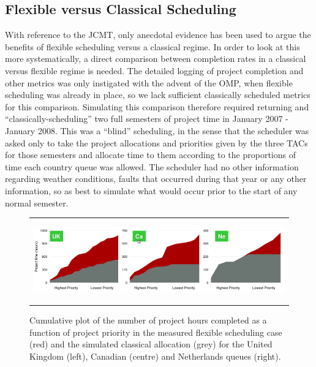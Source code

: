 \documentclass[]{spie}  %
\begin{document}
\subsection{Flexible versus Classical Scheduling}\label{sec:sched}

With reference to the JCMT, only anecdotal evidence has been used to
argue the benefits of flexible scheduling versus a classical regime.
In order to look at this more systematically, a direct comparison
between completion rates in a classical versus flexible regime is
needed. The detailed logging of project completion and other metrics
was only instigated with the advent of the OMP, when flexible
scheduling was already in place, so we lack sufficient classically
scheduled metrics for this comparison. Simulating this comparison
therefore required returning and ``classically-scheduling'' two full
semesters of project time in January 2007 - January 2008. This was a
``blind'' scheduling, in the sense that the scheduler was asked only to
take the project allocations and priorities given by the three TACs
for those semesters and allocate time to them according to the
proportions of time each country queue was allowed. The scheduler had
no other information regarding weather conditions, faults that
occurred during that year or any other information, so as best to
simulate what would occur prior to the start of any normal semester.

\begin{figure}[t]
   \begin{center}
   \begin{tabular}{c}
   \includegraphics[height=3.5cm]{projecthours_cumul_2007}
   \end{tabular}
   \end{center}
   \caption{\label{fig:cvf_hours} Cumulative plot of the number of project hours completed as a function of project priority in the measured flexible scheduling case (red) and the simulated classical allocation (grey) for the United Kingdom (left), Canadian (centre) and Netherlands queues (right).  }

\end{figure}
\end{document}
